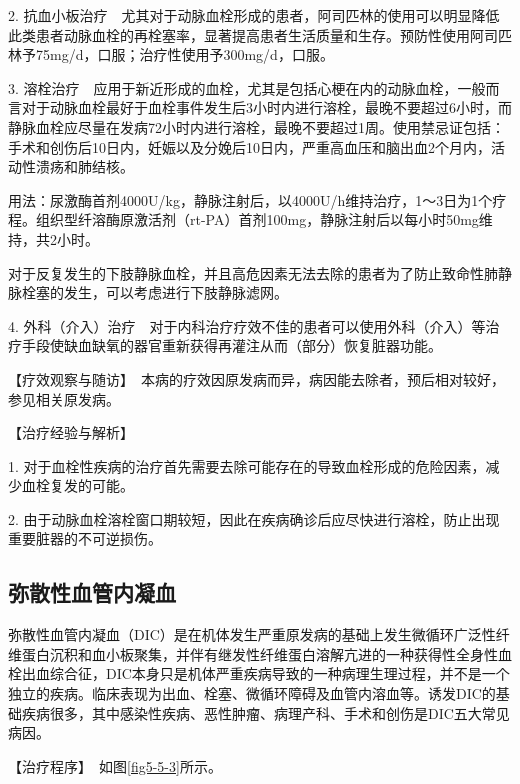2.
抗血小板治疗　尤其对于动脉血栓形成的患者，阿司匹林的使用可以明显降低此类患者动脉血栓的再栓塞率，显著提高患者生活质量和生存。预防性使用阿司匹林予75mg/d，口服；治疗性使用予300mg/d，口服。

3.
溶栓治疗　应用于新近形成的血栓，尤其是包括心梗在内的动脉血栓，一般而言对于动脉血栓最好于血栓事件发生后3小时内进行溶栓，最晚不要超过6小时，而静脉血栓应尽量在发病72小时内进行溶栓，最晚不要超过1周。使用禁忌证包括：手术和创伤后10日内，妊娠以及分娩后10日内，严重高血压和脑出血2个月内，活动性溃疡和肺结核。

用法：尿激酶首剂4000U/kg，静脉注射后，以4000U/h维持治疗，1～3日为1个疗程。组织型纤溶酶原激活剂（rt-PA）首剂100mg，静脉注射后以每小时50mg维持，共2小时。

对于反复发生的下肢静脉血栓，并且高危因素无法去除的患者为了防止致命性肺静脉栓塞的发生，可以考虑进行下肢静脉滤网。

4.
外科（介入）治疗　对于内科治疗疗效不佳的患者可以使用外科（介入）等治疗手段使缺血缺氧的器官重新获得再灌注从而（部分）恢复脏器功能。

【疗效观察与随访】　本病的疗效因原发病而异，病因能去除者，预后相对较好，参见相关原发病。

【治疗经验与解析】

1.
对于血栓性疾病的治疗首先需要去除可能存在的导致血栓形成的危险因素，减少血栓复发的可能。

2.
由于动脉血栓溶栓窗口期较短，因此在疾病确诊后应尽快进行溶栓，防止出现重要脏器的不可逆损伤。

\subsection{弥散性血管内凝血}

弥散性血管内凝血（DIC）是在机体发生严重原发病的基础上发生微循环广泛性纤维蛋白沉积和血小板聚集，并伴有继发性纤维蛋白溶解亢进的一种获得性全身性血栓出血综合征，DIC本身只是机体严重疾病导致的一种病理生理过程，并不是一个独立的疾病。临床表现为出血、栓塞、微循环障碍及血管内溶血等。诱发DIC的基础疾病很多，其中感染性疾病、恶性肿瘤、病理产科、手术和创伤是DIC五大常见病因。

【治疗程序】　如图\ref{fig5-5-3}所示。


